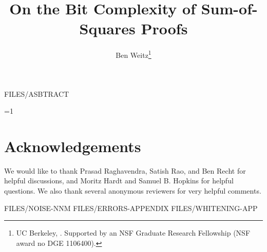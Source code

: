 \documentclass[11pt,letterpaper]{article}
\title{On the Bit Complexity of Sum-of-Squares Proofs}
\author{%
\normalsize
Ben Weitz\thanks{UC Berkeley, \protect\email{bsweitz@cs.berkeley.edu}. Supported by an NSF Graduate Research Fellowship (NSF award no DGE 1106400).}
}
\def\showtableofcontents{0}
\begin{document}
\maketitle

\draftbox

\thispagestyle{empty}

FILES/ASBTRACT
\clearpage

\ifnum\showtableofcontents=1
{
\tableofcontents
\thispagestyle{empty}
 }
\fi

\clearpage

\setcounter{page}{1}









\section*{Acknowledgements}
We would like to thank Prasad Raghavendra, Satish Rao, and Ben Recht for helpful discussions, and Moritz Hardt and Samuel B. Hopkins for helpful questions.
We also thank several anonymous reviewers for very helpful comments.

\addreferencesection
%
%

\appendix



FILES/NOISE-NNM
FILES/ERRORS-APPENDIX
FILES/WHITENING-APP
\end{document}
